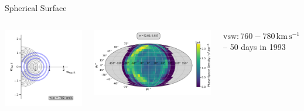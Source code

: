 \documentclass{beamer}
\begin{document}
\begin{frame}{Spherical Surface}
\begin{columns}
\column{1.8cm}
\vspace{-4.5cm}
\includegraphics[scale=.3]{Pics/cov.pdf}

			
\column{16cm}
\vspace{2.2cm}

	
	\includegraphics[scale=.51]{Pics/sky_ps.pdf}

\vspace{-0.9cm}
\begin{center}
	 {\tiny $\mathrm{vsw}:760 - 780 \, \mathrm{km\,s^{-1}}$ --
		50 days in 1993}
\end{center}
\column{4cm}
\end{columns}
\end{frame}
\end{document}
